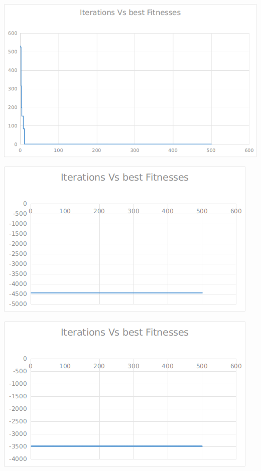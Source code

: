 \documentclass[12pt]{article}
\begin{document}
				\begin{minipage}{0.6\linewidth}
					\includegraphics[width=\linewidth]{9.png}
				\end{minipage}
				\hfill
				\begin{minipage}{0.6\linewidth}
					\includegraphics[width=\linewidth]{10.png}
				\end{minipage}
				\begin{minipage}{0.6\linewidth}
					\includegraphics[width=\linewidth]{11.png}
				\end{minipage}
\end{document}
